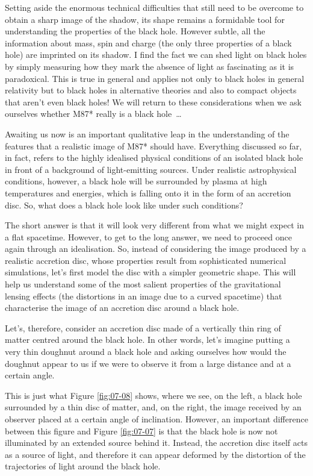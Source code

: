 Setting aside the enormous technical difficulties that still need to be overcome to
obtain a sharp image of the shadow, its shape remains a formidable tool for
understanding the properties of the black hole. However subtle, all the information
about mass, spin and charge (the only three properties of a black hole) are imprinted on
its shadow. I find the fact we can shed light on black holes by simply measuring how
they mark the absence of light as fascinating as it is paradoxical. This is true in
general and applies not only to black holes in general relativity but to black holes in
alternative theories and also to compact objects that aren't even black holes! We will
return to these considerations when we ask ourselves whether M87*
really is a black hole~\ldots{}

Awaiting us now is an important qualitative leap in the understanding of the features
that a realistic image of M87* should have. Everything discussed so
far, in fact, refers to the highly idealised physical conditions of an isolated black
hole in front of a background of light-emitting sources. Under realistic astrophysical
conditions, however, a black hole will be surrounded by plasma at high temperatures and
energies, which is falling onto it in the form of an accretion disc. So, what does a
black hole look like under such conditions?

The short answer is that it will look very different from what we might expect in a flat
spacetime. However, to get to the long answer, we need to proceed once again through an
idealisation. So, instead of considering the image produced by a realistic accretion
disc, whose properties result from sophisticated numerical simulations, let's first
model the disc with a simpler geometric shape. This will help us understand some of the
most salient properties of the gravitational lensing effects (the distortions in an
image due to a curved spacetime) that characterise the image of an accretion disc around
a black hole.

Let's, therefore, consider an accretion disc made of a vertically
thin ring of matter centred around the black hole. In other words, let's imagine putting
a very thin doughnut around a black hole and asking ourselves how would the doughnut
appear to us if we were to observe it from a large distance and at a certain angle.

This is just what Figure \ref{fig:07-08} shows, where we see, on the left, a black hole surrounded
by a thin disc of matter, and, on the right, the image received by an observer placed at
a certain angle of inclination. However, an important difference between this figure and
Figure \ref{fig:07-07} is that the black hole is now not illuminated by an extended source behind
it. Instead, the accretion disc itself acts as a source of light, and
therefore it can appear deformed by the distortion of the trajectories of light around
the black hole.

